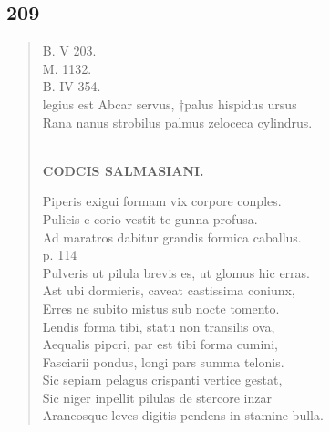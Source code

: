 \documentclass[11pt, a4paper]{report}
\begin{document}
            \subsection*{209}
      \begin{verse}
      B. V 203. \\ M. 1132. \\ B. IV 354. \\ legius est Abcar servus, †palus hispidus ursus \\ Rana nanus strobilus palmus zeloceca cylindrus. \\ 
        ﻿\pagebreak 
    \begin{center} \textbf{CODCIS SALMASIANI.} \end{center} \marginpar{[179]} Piperis exigui formam vix corpore conples. \\ Pulicis e corio vestit te gunna profusa. \\ Ad maratros dabitur grandis formica caballus. \\ p. 114 \\ Pulveris ut pilula brevis es, ut glomus hic erras. \\ Ast ubi dormieris, caveat castissima coniunx, \\ Erres ne subito mistus sub nocte tomento. \\ Lendis forma tibi, statu non transilis ova, \\ Aequalis pipcri, par est tibi forma cumini, \\ Fasciarii pondus, longi pars summa telonis. \\ Sic sepiam pelagus crispanti vertice gestat, \\ Sic niger inpellit pilulas de stercore inzar \\ Araneosque leves digitis pendens in stamine bulla. \\ 
      \end{verse}
  
\end{document}
